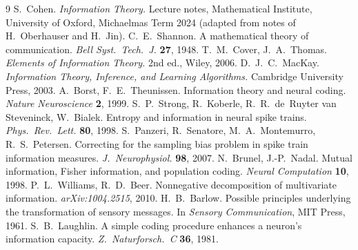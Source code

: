 \documentclass[11pt]{article}
\begin{document}
\begin{thebibliography}{9}
 S.~Cohen. \emph{Information Theory.} Lecture notes, Mathematical Institute,
  University of Oxford, Michaelmas Term 2024 (adapted from notes of H.~Oberhauser and H.~Jin).
 C.~E.~Shannon. A mathematical theory of communication.
  \emph{Bell Syst.\ Tech.\ J.} \textbf{27}, 1948.
 T.~M.~Cover, J.~A.~Thomas. \emph{Elements of Information Theory.}
  2nd ed., Wiley, 2006.
 D.~J.~C.~MacKay. \emph{Information Theory, Inference, and Learning
  Algorithms.} Cambridge University Press, 2003.
 A.~Borst, F.~E.~Theunissen. Information theory and neural coding.
  \emph{Nature Neuroscience} \textbf{2}, 1999.
 S.~P.~Strong, R.~Koberle, R.~R.~de~Ruyter van Steveninck, W.~Bialek. Entropy
  and information in neural spike trains. \emph{Phys.\ Rev.\ Lett.} \textbf{80}, 1998.
 S.~Panzeri, R.~Senatore, M.~A.~Montemurro, R.~S.~Petersen. Correcting for the
  sampling bias problem in spike train information measures. \emph{J.\ Neurophysiol.} \textbf{98}, 2007.
 N.~Brunel, J.-P.~Nadal. Mutual information, Fisher information, and
  population coding. \emph{Neural Computation} \textbf{10}, 1998.
 P.~L.~Williams, R.~D.~Beer. Nonnegative decomposition of multivariate
  information. \emph{arXiv:1004.2515}, 2010.
 H.~B.~Barlow. Possible principles underlying the transformation of sensory
  messages. In \emph{Sensory Communication}, MIT Press, 1961.
 S.~B.~Laughlin. A simple coding procedure enhances a neuron's information
  capacity. \emph{Z.\ Naturforsch.\ C} \textbf{36}, 1981.
\end{thebibliography}
\end{document}
